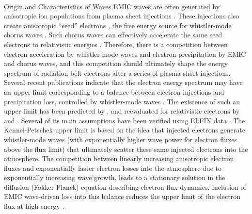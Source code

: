 \documentclass[
  letterpaper,
  DIV=11,
  numbers=noendperiod]{scrartcl}
\makeatletter
\let\oldparagraph\paragraph
\renewcommand{\paragraph}{
    \@ifstar
      \xxxParagraphStar
      \xxxParagraphNoStar
  }
\newcommand{\xxxParagraphStar}[1]{\oldparagraph*{#1}\mbox{}}
\newcommand{\xxxParagraphNoStar}[1]{\oldparagraph{#1}\mbox{}}
\makeatother
\begin{document}
\paragraph{Origin and Characteristics of Waves}\label{origin-and-characteristics-of-waves}
EMIC waves are often generated by anisotropic ion populations from plasma sheet injections \citep{Jun19:emic}. These injections also create anisotropic ``seed'' electrons \citep{Miyoshi13,Jaynes15:seedelectrons}, the free energy source for whistler-mode chorus waves \citep{Tao11,Fu14:radiation_belts,Zhang18:whistlers&injections}. Such chorus waves can effectively accelerate the same seed electrons to relativistic energies \citep{miyoshiRebuildingProcessOuter2003, thorneRapidLocalAcceleration2013, mourenasApproximateAnalyticalSolutions2014, allisonLocalHeatingRadiation2020}. Therefore, there is a competition between electron acceleration by whistler-mode waves \citep[supported by direct adiabatic heating during injections, see, e.g.][]{sorathiaModelingDepletionRecovery2018} and electron precipitation by EMIC and chorus waves, and this competition should ultimately shape the energy spectrum of radiation belt electrons after a series of plasma sheet injections. Several recent publications indicate that the electron energy spectrum may have an upper limit corresponding to a balance between electron injections and precipitation loss, controlled by whistler-mode waves \citep{oliferTaleTwoRadiation2021, oliferNaturalLimitSpectral2022}. The existence of such an upper limit has been predicted by \citet{kennelLimitStablyTrapped1966}, and reevaluated for relativistic electrons by \citet{summersLimitStablyTrapped2009} and \citet{summersLimitingEnergySpectrum2014}. Several of its main assumptions have been verified using ELFIN data \citep{mourenasCheckingKeyAssumptions2024}. The Kennel-Petschek upper limit is based on the idea that injected electrons generate whistler-mode waves (with exponentially higher wave power for electron fluxes above the flux limit) that ultimately scatter these same injected electrons into the atmosphere. The competition between linearly increasing anisotropic electron fluxes and exponentially faster electron losses into the atmosphere due to exponentially increasing wave growth, leads to a stationary solution in the diffusion (Fokker-Planck) equation describing electron flux dynamics. Inclusion of EMIC wave-driven loss into this balance reduces the upper limit of the electron flux at high energy \citep{mourenasExtremeEnergySpectra2022}.
\end{document}
